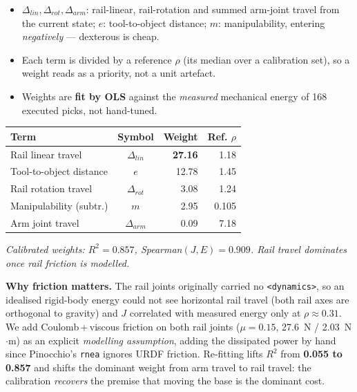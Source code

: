 \documentclass[20pt,a4paper]{extarticle}
\newcommand{\figcap}[1]{{\par\vspace{0.8mm}\centering
  \fontsize{14}{17}\selectfont\itshape\color{pgrey}#1\par\vspace{0.8mm}}}
\newcommand{\num}[1]{\textcolor{pblue}{\bfseries #1}}
\newcommand{\lead}[1]{\textbf{#1}}
\begin{document}
\begin{minipage}[t]{0.487\linewidth}
\begin{itemize}
  \item $\Delta_{lin},\Delta_{rot},\Delta_{arm}$: rail-linear, rail-rotation and
        summed arm-joint travel from the current state; $e$: tool-to-object
        distance; $m$: manipulability, entering \emph{negatively} --- dexterous
        is cheap.
  \item Each term is divided by a reference $\rho$ (its median over a
        calibration set), so a weight reads as a priority, not a unit artefact.
  \item Weights are \textbf{fit by OLS} against the \emph{measured} mechanical
        energy of 168 executed picks, not hand-tuned.
\end{itemize}

\vspace{1mm}
{\centering\fontsize{16}{20}\selectfont
\begin{tabular}{@{}l c r r@{}}
\toprule
\textbf{Term} & \textbf{Symbol} & \textbf{Weight} & \textbf{Ref. $\rho$}\\
\midrule
Rail linear travel      & $\Delta_{lin}$ & \num{27.16} & 1.18\\
Tool-to-object distance & $e$            & 12.78 & 1.45\\
Rail rotation travel    & $\Delta_{rot}$ & 3.08  & 1.24\\
Manipulability (subtr.) & $m$            & 2.95  & 0.105\\
Arm joint travel        & $\Delta_{arm}$ & 0.09  & 7.18\\
\bottomrule
\end{tabular}\par}
\figcap{Calibrated weights: $R^2=0.857$, Spearman$(J,E)=0.909$. Rail travel
dominates once rail friction is modelled.}

\begin{keybox}
\fontsize{15}{18}\selectfont
\lead{Why friction matters.} The rail joints originally carried no
\texttt{<dynamics>}, so an idealised rigid-body energy could not see horizontal
rail travel (both rail axes are orthogonal to gravity) and $J$ correlated with
measured energy only at $\rho\approx0.31$. We add Coulomb\,+\,viscous friction
on both rail joints (\num{$\mu=0.15$}, 27.6~N / 2.03~N$\cdot$m) as an explicit
\emph{modelling assumption}, adding the dissipated power by hand since
Pinocchio's \texttt{rnea} ignores URDF friction. Re-fitting lifts $R^2$ from
\num{0.055 to 0.857} and shifts the dominant weight from arm travel to rail
travel: the calibration \emph{recovers} the premise that moving the base is the
dominant cost.
\end{keybox}


\end{minipage}
\end{document}
